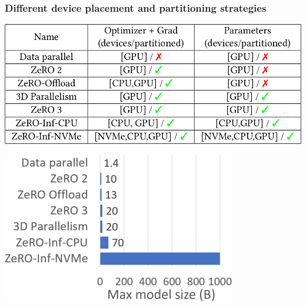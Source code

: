 \documentclass{beamer}
\begin{document}
\begin{frame}
    \frametitle{\normalsize{Different device placement and partitioning strategies}}
    \begin{center}
        \includegraphics[scale=1.0]{img/zero_infinity_table_compare.png}
    \end{center}
    \begin{center}
        \includegraphics[scale=1.3]{img/zero_infinity_max_model.png}
    \end{center}
\end{frame}
\end{document}

